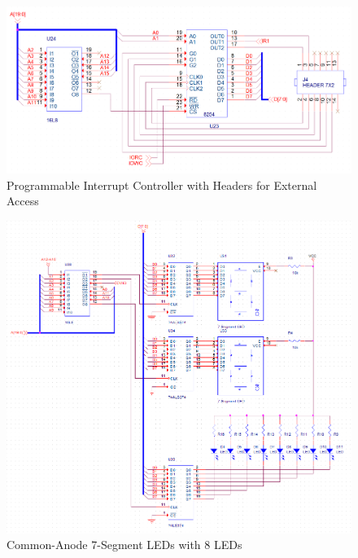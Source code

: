\begin{appendices}
        \begin{figure}[ht]
            \begin{center}
                \includegraphics[width=1\textwidth]{figures/schematics/pit.png}
                \caption{Programmable Interrupt Controller with Headers for External Access} \label{fig:page9}
            \end{center}
        \end{figure}

        \begin{figure}[ht]
            \begin{center}
                \includegraphics[width=1\textwidth]{figures/schematics/led.png}
                \caption{Common-Anode 7-Segment LEDs with 8 LEDs} \label{fig:page10}
            \end{center}
        \end{figure}


\end{appendices}
